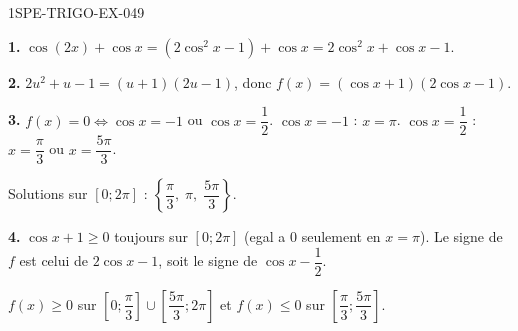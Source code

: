 \begin{corrige}{1SPE-TRIGO-EX-049}

\textbf{1.} $\cos(2x) + \cos x = (2\cos^2 x - 1) + \cos x = 2\cos^2 x + \cos x - 1$.

\textbf{2.} $2u^2 + u - 1 = (u+1)(2u-1)$, donc $f(x) = (\cos x + 1)(2\cos x - 1)$.

\textbf{3.} $f(x) = 0 \iff \cos x = -1$ ou $\cos x = \dfrac{1}{2}$.
$\cos x = -1$ : $x = \pi$.
$\cos x = \dfrac{1}{2}$ : $x = \dfrac{\pi}{3}$ ou $x = \dfrac{5\pi}{3}$.

Solutions sur $[0;2\pi]$ : $\left\{\dfrac{\pi}{3},\;\pi,\;\dfrac{5\pi}{3}\right\}$.

\textbf{4.} $\cos x + 1 \geqslant 0$ toujours sur $[0;2\pi]$ (egal a $0$ seulement en $x = \pi$). Le signe de $f$ est celui de $2\cos x - 1$, soit le signe de $\cos x - \dfrac{1}{2}$.

$f(x) \geqslant 0$ sur $\left[0;\dfrac{\pi}{3}\right] \cup \left[\dfrac{5\pi}{3};2\pi\right]$ et $f(x) \leqslant 0$ sur $\left[\dfrac{\pi}{3};\dfrac{5\pi}{3}\right]$.

\end{corrige}
